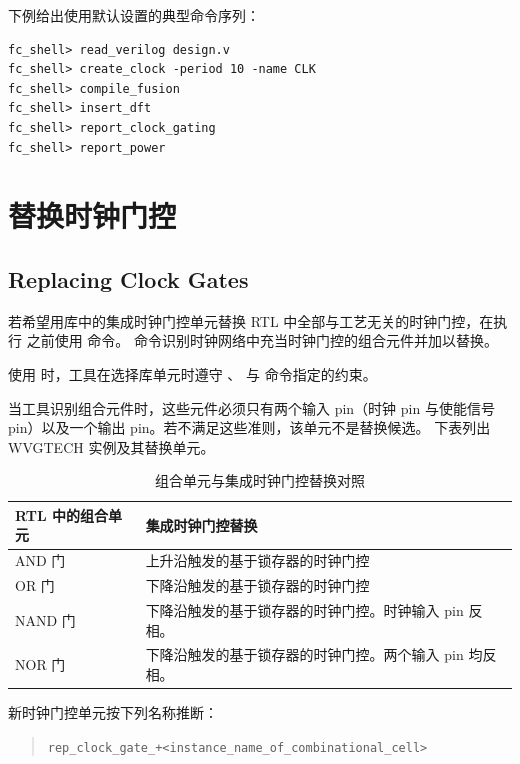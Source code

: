 下例给出使用默认设置的典型命令序列：
\begin{lstlisting}
fc_shell> read_verilog design.v
fc_shell> create_clock -period 10 -name CLK
fc_shell> compile_fusion
fc_shell> insert_dft
fc_shell> report_clock_gating
fc_shell> report_power
\end{lstlisting}

\section{替换时钟门控}
\subsection*{Replacing Clock Gates}

若希望用库中的集成时钟门控单元替换 RTL 中全部与工艺无关的时钟门控，在执行  之前使用  命令。
 命令识别时钟网络中充当时钟门控的组合元件并加以替换。

使用  时，工具在选择库单元时遵守 、 与  命令指定的约束。

当工具识别组合元件时，这些元件必须只有两个输入 pin（时钟 pin 与使能信号 pin）以及一个输出 pin。若不满足这些准则，该单元不是替换候选。
下表列出 WVGTECH 实例及其替换单元。

\begin{table}[htbp]
\centering
\caption{组合单元与集成时钟门控替换对照}
\label{tab:cg-replace}
\begin{tabularx}{\textwidth}{@{}l X@{}}
\toprule
\textbf{RTL 中的组合单元} & \textbf{集成时钟门控替换} \\
\midrule
AND 门 & 上升沿触发的基于锁存器的时钟门控 \\
OR 门 & 下降沿触发的基于锁存器的时钟门控 \\
NAND 门 & 下降沿触发的基于锁存器的时钟门控。时钟输入 pin 反相。 \\
NOR 门 & 下降沿触发的基于锁存器的时钟门控。两个输入 pin 均反相。 \\
\bottomrule
\end{tabularx}
\end{table}

新时钟门控单元按下列名称推断：
\begin{quote}
\texttt{rep\_clock\_gate\_+<instance\_name\_of\_combinational\_cell>}
\end{quote}

